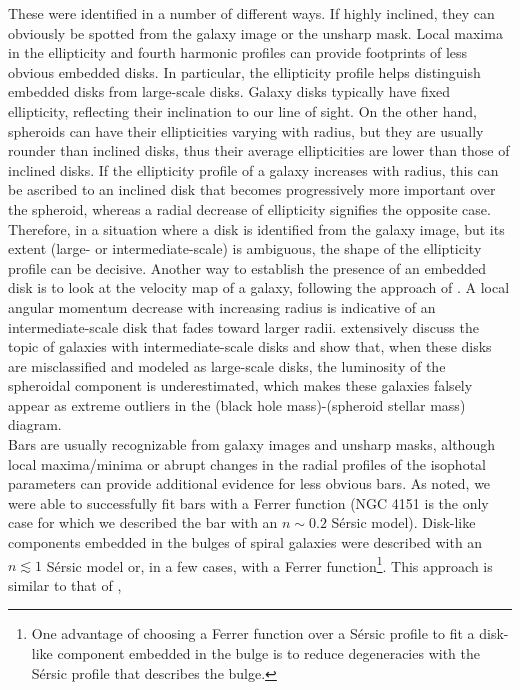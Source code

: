 \documentclass[preprint2]{emulateapj}
\begin{document}
These were identified in a number of different ways. 
If highly inclined, they can obviously be spotted from the galaxy image or the unsharp mask.
Local maxima in the ellipticity and fourth harmonic profiles 
can provide footprints of less obvious embedded disks.
In particular, the ellipticity profile helps distinguish embedded disks from large-scale disks.
Galaxy disks typically have fixed ellipticity, reflecting their inclination to our line of sight.
On the other hand, spheroids can have their ellipticities varying with radius,
but they are usually rounder than inclined disks, thus their average ellipticities are lower than those of inclined disks.
If the ellipticity profile of a galaxy increases with radius, 
this can be ascribed to an inclined disk that becomes progressively more important over the spheroid,
whereas a radial decrease of ellipticity signifies the opposite case.
Therefore, in a situation where a disk is identified from the galaxy image, 
but its extent (large- or intermediate-scale) is ambiguous,
the shape of the ellipticity profile can be decisive. 
Another way to establish the presence of an embedded disk is to look at the velocity map of a galaxy,
following the approach of \citet{arnold2014}. 
A local angular momentum decrease with increasing radius is indicative of an intermediate-scale disk 
that fades toward larger radii. 
\cite{savorgnangraham2015ellicular} extensively discuss the topic of galaxies with intermediate-scale disks 
and show that, when these disks are misclassified and modeled as large-scale disks, 
the luminosity of the spheroidal component is underestimated, 
which makes these galaxies falsely appear as extreme outliers in the (black hole mass)-(spheroid stellar mass) diagram.  \\
Bars are usually recognizable from galaxy images and unsharp masks, 
although local maxima/minima or abrupt changes in the radial profiles of the isophotal parameters 
can provide additional evidence for less obvious bars. 
As noted, we were able to successfully fit bars with a Ferrer function 
(NGC 4151 is the only case for which we described the bar with an $n \sim 0.2$ S\'ersic model). 
Disk-like components embedded in the bulges of spiral galaxies were described with an $n \lesssim 1$ S\'ersic model or, 
in a few cases, with a Ferrer function\footnote{One advantage of choosing a Ferrer function over a S\'ersic profile 
to fit a disk-like component embedded in the bulge 
is to reduce degeneracies with the S\'ersic profile that describes the bulge.}. 
This approach is similar to that of \cite{laurikainen2010}, 
\end{document}
